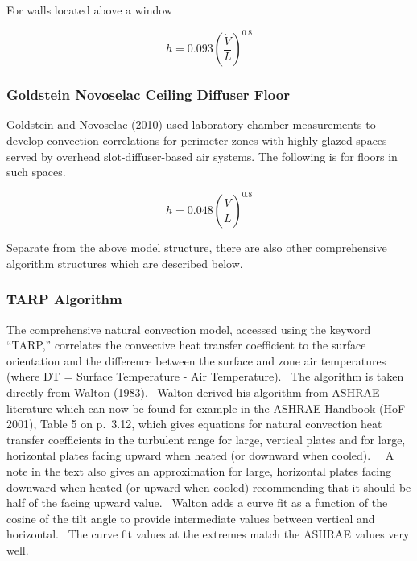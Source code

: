 For walls located above a window

\begin{equation}
h = 0.093{\left( {\frac{{\dot V}}{L}} \right)^{0.8}}
\end{equation}

\subsubsection{Goldstein Novoselac Ceiling Diffuser Floor}\label{goldstein-novoselac-ceiling-diffuser-floor}

Goldstein and Novoselac (2010) used laboratory chamber measurements to develop convection correlations for perimeter zones with highly glazed spaces served by overhead slot-diffuser-based air systems. The following is for floors in such spaces.

\begin{equation}
h = 0.048{\left( {\frac{{\dot V}}{L}} \right)^{0.8}}
\end{equation}

Separate from the above model structure, there are also other comprehensive algorithm structures which are described below.

\subsubsection{TARP Algorithm}\label{tarp-algorithm}

The comprehensive natural convection model, accessed using the keyword ``TARP,'' correlates the convective heat transfer coefficient to the surface orientation and the difference between the surface and zone air temperatures (where DT = Surface Temperature - Air Temperature).~ The algorithm is taken directly from Walton (1983).~ Walton derived his algorithm from ASHRAE literature which can now be found for example in the ASHRAE Handbook (HoF 2001), Table 5 on p.~3.12, which gives equations for natural convection heat transfer coefficients in the turbulent range for large, vertical plates and for large, horizontal plates facing upward when heated (or downward when cooled).~~ A note in the text also gives an approximation for large, horizontal plates facing downward when heated (or upward when cooled) recommending that it should be half of the facing upward value.~ Walton adds a curve fit as a function of the cosine of the tilt angle to provide intermediate values between vertical and horizontal.~ The curve fit values at the extremes match the ASHRAE values very well.


